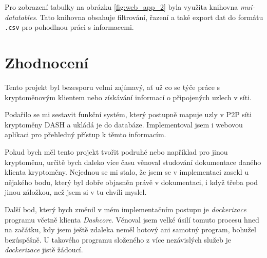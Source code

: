 \documentclass[12pt]{article}
\begin{document}
\noindent Pro zobrazení tabulky na obrázku \ref{fig:web_app_2} byla využita knihovna \textit{mui-datatables}. Tato knihovna obsahuje filtrování, řazení a také export dat do formátu \texttt{.csv} pro pohodlnou práci s informacemi.

\section{Zhodnocení}
Tento projekt byl bezesporu velmi zajímavý, ať už co se týče práce s kryptoměnovým klientem nebo získávání informací o připojených uzlech v síti.

\noindent Podařilo se mi sestavit funkční systém, který postupně mapuje uzly v P2P síti kryptoměny DASH a ukládá je do databáze. Implementoval jsem i webovou aplikaci pro přehledný přístup k těmto informacím.

\noindent Pokud bych měl tento projekt tvořit podruhé nebo například pro jinou kryptoměnu, určitě bych daleko více času věnoval studování dokumentace daného klienta kryptoměny. Nejednou se mi stalo, že jsem se v implementaci zasekl u nějakého bodu, který byl dobře objasněn právě v dokumentaci, i když třeba pod jinou záložkou, než jsem si v tu chvíli myslel.

\noindent Další bod, který bych změnil v mém implementačním postupu je \textit{dockerizace} programu včetně klienta \textit{Dashcore}. Věnoval jsem velké úsilí tomuto procesu hned na začátku, kdy jsem ještě zdaleka neměl hotový ani samotný program, bohužel bezúspěšně. U takového programu složeného z více nezávislých služeb je \textit{dockerizace} jistě žádoucí.

\newpage
\printbibliography
\end{document}
